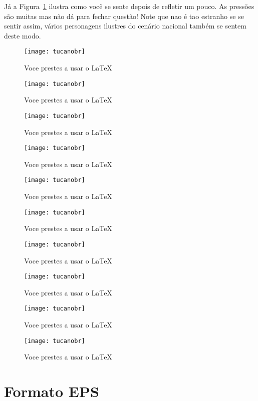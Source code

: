 Já a Figura~\ref{toucan} ilustra como você se sente depois de refletir
um pouco. As pressões são muitas mas não dá para fechar
questão! Note que nao é tao estranho se se sentir assim, vários
personagens ilustres do cenário nacional também se sentem deste modo.
\begin{figure}[htbp]
\centering \texttt{[image: tucanobr]} \caption{Voce prestes a usar o LaTeX}%
\label{toucan}%
\end{figure}
\begin{figure}[htbp]
\centering \texttt{[image: tucanobr]} \caption{Voce prestes a usar o LaTeX}%
\label{toucan1}%
\end{figure}
\begin{figure}[htbp]
\centering \texttt{[image: tucanobr]} \caption{Voce prestes a usar o LaTeX}%
\label{toucan2}%
\end{figure}
\begin{figure}[htbp]
\centering \texttt{[image: tucanobr]} \caption{Voce prestes a usar o LaTeX}%
\label{toucan3}%
\end{figure}
\begin{figure}[htbp]
\centering \texttt{[image: tucanobr]} \caption{Voce prestes a usar o LaTeX}%
\label{toucan4}%
\end{figure}
\begin{figure}[htbp]
\centering \texttt{[image: tucanobr]} \caption{Voce prestes a usar o LaTeX}%
\label{toucan5}%
\end{figure}
\begin{figure}[htbp]
\centering \texttt{[image: tucanobr]} \caption{Voce prestes a usar o LaTeX}%
\label{toucan6}%
\end{figure}
\begin{figure}[htbp]
\centering \texttt{[image: tucanobr]} \caption{Voce prestes a usar o LaTeX}%
\label{toucan7}%
\end{figure}
\begin{figure}[htbp]
\centering \texttt{[image: tucanobr]} \caption{Voce prestes a usar o LaTeX}%
\label{toucan8}%
\end{figure}
\begin{figure}[htbp]
\centering \texttt{[image: tucanobr]} \caption{Voce prestes a usar o LaTeX}%
\label{toucan9}%
\end{figure}

\section{Formato EPS}

